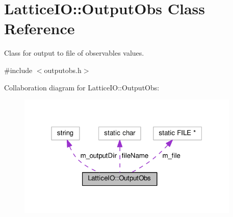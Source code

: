 \hypertarget{classLatticeIO_1_1OutputObs}{}\section{Lattice\+IO\+:\+:Output\+Obs Class Reference}
\label{classLatticeIO_1_1OutputObs}


Class for output to file of observables values.  




{\ttfamily \#include $<$outputobs.\+h$>$}



Collaboration diagram for Lattice\+IO\+:\+:Output\+Obs\+:\nopagebreak
\begin{figure}[H]
\begin{center}
\leavevmode
\includegraphics[width=301pt]{dc/d4b/classLatticeIO_1_1OutputObs__coll__graph}
\end{center}
\end{figure}
